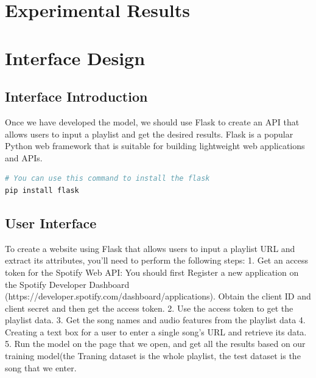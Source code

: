 \documentclass{article}
\begin{document}
\section{Experimental Results}

\section{Interface Design}
\maketitle
\subsection{Interface Introduction}
Once we have developed the model, we should use Flask to create an API that allows users to input a playlist and get the desired results. Flask is a popular Python web framework that is suitable for building lightweight web applications and APIs.
\begin{lstlisting}[language=Python]
# You can use this command to install the flask
pip install flask
\end{lstlisting}


\subsection{User Interface}
To create a website using Flask that allows users to input a playlist URL and extract its attributes, you'll need to perform the following steps:
1. Get an access token for the Spotify Web API:
You should first Register a new application on the Spotify Developer Dashboard (https://developer.spotify.com/dashboard/applications).
Obtain the client ID and client secret and then get the access token.
2. Use the access token to get the playlist data.
3. Get the song names and audio features from the playlist data
4. Creating a text box for a user to enter a single song's URL and retrieve its data.
5. Run the model on the page that we open, and get all the results based on our training model(the Traning dataset is the whole playlist, the test dataset is the song that we enter.
\end{document}
